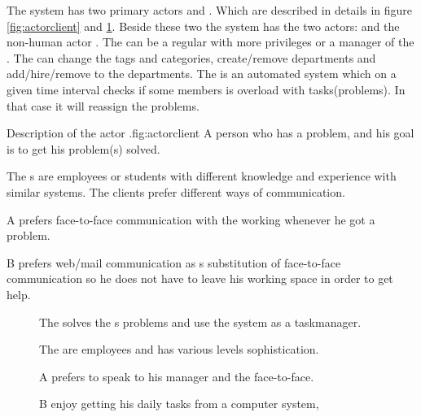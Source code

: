 The system has two primary actors \client{} and \staff. Which are described in details in figure \ref{fig:actorclient} and \ref{fig:actorstaff}. Beside these two the system has the two actors: \sadmin{} and the non-human actor \wmon. The \sadmin{} can be a regular \staff{} with more privileges or a manager of the \staff. The \sadmin{} can change the tags and categories, create/remove departments and add/hire/remove \staff{} to the departments. The \wmon[] is an automated system which on a given time interval checks if some \staff{} members is overload with tasks(problems). In that case it will reassign the problems.

\begin{sadlist}{\Client}{Description of the actor \client.}{fig:actorclient}
 A person who has a problem, and his goal is to get his problem(s) solved.

 The \client{}s are employees or students with different knowledge and experience with similar systems. The clients prefer different ways of communication.%

 \Client{} A prefers face-to-face communication with the working \staff{} whenever he got a problem. 

\client[c] B prefers web/mail communication as s substitution of face-to-face communication so he does not have to leave his working space in order to get help. 

\end{sadlist}




\begin{figure}[htps]

\begin{sadlistar}{\Staff}

 The \staff{} solves the \client[]s problems and use the system as a taskmanager.  

 The \staff[] are employees and has various levels sophistication.

 \staff[c] A prefers to speak to his manager and the \client[] face-to-face.

\staff[c] B enjoy getting his daily tasks from a computer system, 
 \end{sadlistar}
 \caption{}
 \label{fig:actorstaff}
 \end{figure}